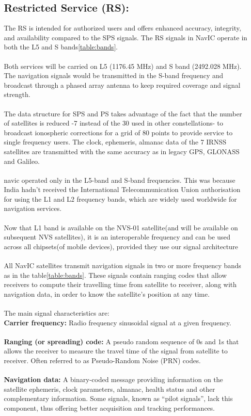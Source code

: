 \subsection{Restricted Service (RS):}
The RS is intended for authorized users and offers enhanced accuracy, integrity, and availability compared to the SPS signals. The RS signals in NavIC operate in both the L5 and S bands\ref{table:bands}.
	\\
	\\
Both services will be carried on L5 (1176.45 MHz) and S band (2492.028 MHz). The navigation signals would be transmitted in the S-band frequency and broadcast through a phased array antenna to keep required coverage and signal strength.
\\
\\
The data structure for SPS and PS takes advantage of the fact that the number of satellites is reduced -7 instead of the 30 used in other constellations- to broadcast ionospheric corrections for a grid of 80 points to provide service to single frequency users. The clock, ephemeris, almanac data of the 7 IRNSS satellites are transmitted with the same accuracy as in legacy GPS, GLONASS and Galileo.
\\
\\
navic operated only in the L5-band and S-band frequencies. This was because India hadn't received the International Telecommunication Union authorisation for using the L1 and L2 frequency bands, which are widely used worldwide for navigation services.
\\
\\
Now that L1 band is available on the NVS-01 satellite(and will be available on subsequent NVS satellites), it is an interoperable frequency and can be used across all chipsets(of mobile devices), provided they use our signal architecture
\\\\
All NavIC satellites transmit navigation signals in two or more frequency bands as in the table\ref{table:bands}. These signals contain ranging codes that allow receivers to compute their travelling time from satellite to receiver, along with navigation data, in order to know the satellite’s position at any time. \\
\\The main signal characteristics are:
\\
\textbf{Carrier frequency:} Radio frequency sinusoidal signal at a given frequency.
\\\\
\textbf{Ranging (or spreading) code:} A pseudo random sequence of 0s and 1s that allows the receiver to measure the travel time of the signal from satellite to receiver. Often referred to as Pseudo-Random Noise (PRN) codes.
\\\\
\textbf{Navigation data:} A binary-coded message providing information on the satellite ephemeris, clock parameters, almanac, health status and other complementary information. Some signals, known as “pilot signals”, lack this component, thus offering better acquisition and tracking performances.

%
